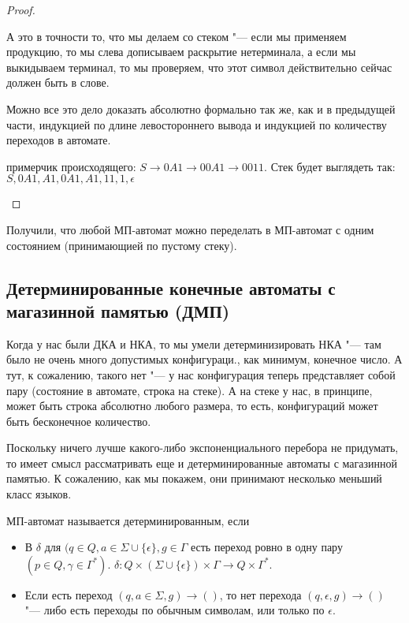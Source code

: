 \begin{proof}
\begin{description}
    А это в точности то, что мы делаем со стеком "--- если мы применяем продукцию, то мы слева дописываем раскрытие нетерминала, а если мы выкидываем терминал, то мы проверяем, что этот символ
    действительно сейчас должен быть в слове.

    Можно все это дело доказать абсолютно формально так же, как и в предыдущей части, индукцией по длине левостороннего вывода и индукцией по количеству переходов в автомате.

    \TODO примерчик происходящего: $S \to 0A1 \to 00A1 \to 0011$. Стек будет выглядеть так: $S, 0A1, A1 ,0A1, A1, 11, 1, \epsilon$
\end{description}
\end{proof}          
\begin{conseq}
    Получили, что любой МП-автомат можно переделать в МП-автомат с одним состоянием (принимающией по пустому стеку).
\end{conseq}

\subsection{Детерминированные конечные автоматы с магазинной памятью (ДМП)}
Когда у нас были ДКА и НКА, то мы умели детерминизировать НКА "--- там было не очень много допустимых конфигураци., как минимум, конечное число.
А тут, к сожалению, такого нет "--- у нас конфигурация теперь представляет собой пару (состояние в автомате, строка на стеке). 
А на стеке у нас, в принципе, может быть строка абсолютно любого размера, то есть, конфигураций может быть бесконечное количество.

Поскольку ничего лучше какого-либо экспоненциального перебора не придумать, то имеет смысл рассматривать еще и детерминированные автоматы с магазинной памятью.
К сожалению, как мы покажем, они принимают несколько меньший класс языков.

\begin{Def}
МП-автомат называется детерминированным, если 
\begin{itemize}
    \item
        В $\delta$ для $(q \in Q, a \in \Sigma \cup \{\epsilon\}, g \in \Gamma$ есть переход ровно в одну пару $(p \in Q, \gamma \in \Gamma^*)$.
        $\delta\colon Q \times (\Sigma \cup \{\epsilon\}) \times \Gamma \to Q \times \Gamma^*$.
    \item
        Если есть переход $(q, a \in \Sigma, g) \to ()$, то нет перехода $(q, \epsilon, g) \to ()$ "--- либо есть переходы по обычным символам, или только по $\epsilon$.
\end{itemize}
\end{Def}


